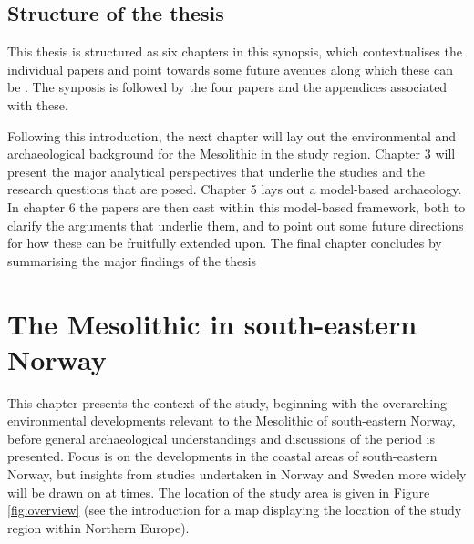 \documentclass[
  12pt,
  a4paper,
  oneside]{book}
\begin{document}
\hypertarget{structure-of-the-thesis}{%
\section{Structure of the thesis}\label{structure-of-the-thesis}}

This thesis is structured as six chapters in this synopsis, which contextualises the individual papers and point towards some future avenues along which these can be . The synposis is followed by the four papers and the appendices associated with these.

Following this introduction, the next chapter will lay out the environmental and archaeological background for the Mesolithic in the study region. Chapter 3 will present the major analytical perspectives that underlie the studies and the research questions that are posed. Chapter 5 lays out a model-based archaeology. In chapter 6 the papers are then cast within this model-based framework, both to clarify the arguments that underlie them, and to point out some future directions for how these can be fruitfully extended upon. The final chapter concludes by summarising the major findings of the thesis

\hypertarget{chapter2}{%
\chapter{The Mesolithic in south-eastern Norway}\label{chapter2}}

This chapter presents the context of the study, beginning with the overarching environmental developments relevant to the Mesolithic of south-eastern Norway, before general archaeological understandings and discussions of the period is presented. Focus is on the developments in the coastal areas of south-eastern Norway, but insights from studies undertaken in Norway and Sweden more widely will be drawn on at times. The location of the study area is given in Figure \ref{fig:overview} (see the introduction for a map displaying the location of the study region within Northern Europe).
\end{document}
